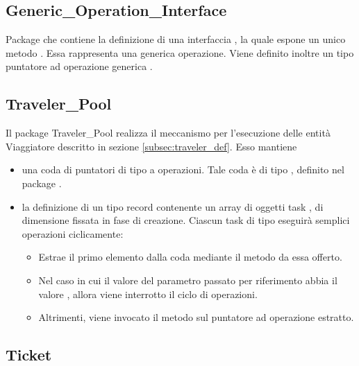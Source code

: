 	\subsection{Generic\_Operation\_Interface}
	
	Package che contiene la definizione di una interfaccia , la quale espone un unico metodo . Essa rappresenta una generica operazione. Viene definito inoltre un tipo puntatore ad operazione generica .
	
	\subsection{Traveler\_Pool}
	
	Il package {Traveler\_Pool} realizza il meccanismo per l'esecuzione delle entità Viaggiatore descritto in sezione \ref{subsec:traveler_def}. Esso mantiene 
	\begin{itemize}
		\item una coda  di puntatori di tipo  a operazioni. Tale coda è di tipo , definito nel package .
		\item la definizione di un tipo record  contenente un array di oggetti task , di dimensione fissata in fase di creazione.
		Ciascun task di tipo  eseguirà semplici operazioni ciclicamente:
		\begin{itemize}
			\item Estrae il primo elemento dalla coda  mediante il metodo  da essa offerto. 
			\item Nel caso in cui il valore del parametro  passato per riferimento abbia il valore , allora viene interrotto il ciclo di operazioni.
			\item Altrimenti, viene invocato il metodo  sul puntatore ad operazione estratto.
		\end{itemize}
	\end{itemize}
	
	\subsection{Ticket}
	
